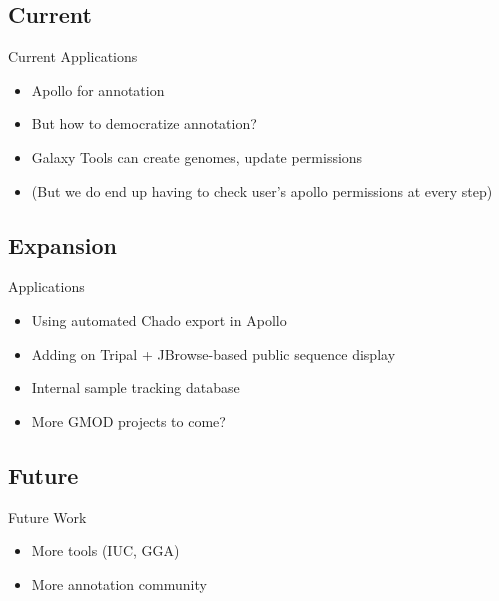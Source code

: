 \documentclass[12pt]{phage3slides} %
\begin{document}
\subsection{Current}
\begin{frame}{Current Applications}
    \begin{itemize}
        \item Apollo for annotation
        \item But how to democratize annotation?
        \item Galaxy Tools can create genomes, update permissions
        \item (But we do end up having to check user's apollo permissions at every step)
    \end{itemize}
\end{frame}

\subsection{Expansion}
\begin{frame}{Applications}
    \begin{itemize}
        \item Using automated Chado export in Apollo
        \item Adding on Tripal + JBrowse-based public sequence display
        \item Internal sample tracking database
        \item More GMOD projects to come?
    \end{itemize}
\end{frame}


\subsection{Future}
\begin{frame}{Future Work}
    \begin{itemize}
        \item More tools (IUC, GGA)
        \item More annotation community
    \end{itemize}
\end{frame}
\end{document}

